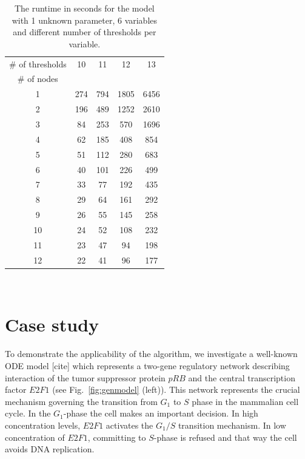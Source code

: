 \documentclass[12pt,oneside, draft]{fithesis2}
\begin{document}
			\begin{table}
				\centering
				\setlength{\tabcolsep}{6pt}
				\begin{tabular}{|*{5}{c|}}
					\hline
						\# of thresholds & 10 & 11 & 12 & 13 \\
						\cline{1-1}
						\# of nodes & & & & \\
					\hline
						1 &	274 &	794 &	1805 &	6456 \\
						2 &	196 &	489 &	1252 &	2610 \\
						3 &	84 &	253 &	570 &	1696 \\
						4 &	62 &	185 &	408 &	 854 \\
						5 &	51 &	112 &	280 & 683 \\
						6 &	40 &	101 &	226 &	499 \\
						7 &	33 &	77 &	192 &	435 \\
						8 &	29 &	64 &	161 &	292 \\
						9 &	26 &	55 &	145 &	258 \\
						10 &	24 &	52 &	108 &	232 \\
						11 &	23 &	47 &	94 &	198 \\
						12 & 22	 & 41	 & 96	&	177 \\
					\hline
				\end{tabular}\\[1em]
				\caption{The runtime in seconds for the model with 1 unknown parameter, 6 variables and different number of thresholds per variable.}
			\end{table}

			\newpage
						\newpage
									\newpage			\newpage
			\section{Case study}
				\label{sec:case}
			
				To demonstrate the applicability of the algorithm, we investigate a well-known ODE model [cite] which represents a two-gene regulatory network describing interaction of the tumor suppressor protein $pRB$ and the central transcription factor $E2F1$ (see Fig.~\ref{fig:genmodel} (left)). This network represents the crucial mechanism governing the transition from $G_1$ to $S$ phase in the mammalian cell cycle. In the $G_1$-phase the cell makes an important decision. In high concentration levels, $E2F1$ activates the $G_1/S$ transition mechanism. In low concentration of $E2F1$, committing to $S$-phase is refused and that way the cell avoids DNA replication.
				
\end{document}
